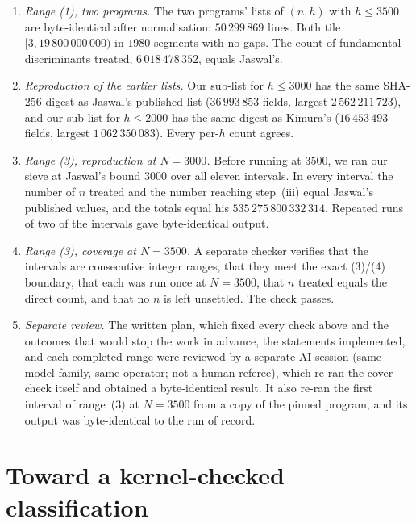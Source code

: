 \documentclass[11pt]{article}
\theoremstyle{definition}
\begin{document}
\begin{enumerate}[leftmargin=*]
\item \emph{Range (1), two programs.} The two programs' lists of $(n, h)$ with $h \le 3500$ are byte-identical after
normalisation: $50\,299\,869$ lines. Both tile $[3, 19\,800\,000\,000)$ in $1980$ segments with no gaps. The count of
fundamental discriminants treated, $6\,018\,478\,352$, equals Jaswal's.
\item \emph{Reproduction of the earlier lists.} Our sub-list for $h \le 3000$ has the same SHA-256 digest as Jaswal's
published list ($36\,993\,853$ fields, largest $2\,562\,211\,723$), and our sub-list for $h \le 2000$ has the same digest as
Kimura's ($16\,453\,493$ fields, largest $1\,062\,350\,083$). Every per-$h$ count agrees.
\item \emph{Range (3), reproduction at $N = 3000$.} Before running at $3500$, we ran our sieve at Jaswal's bound $3000$ over
all eleven intervals. In every interval the number of $n$ treated and the number reaching step~(iii) equal Jaswal's
published values, and the totals equal his $535\,275\,800\,332\,314$. Repeated runs of two of the intervals gave byte-identical output.
\item \emph{Range (3), coverage at $N = 3500$.} A separate checker verifies that the intervals are consecutive integer ranges,
that they meet the exact (3)/(4) boundary, that each was run once at $N = 3500$, that $n$ treated equals the direct count,
and that no $n$ is left unsettled. The check passes.
\item \emph{Separate review.} The written plan, which fixed every check above and the outcomes that would stop the work
in advance, the statements implemented, and each completed range were reviewed by a separate AI session (same model family, same operator; not a human
referee), which re-ran the cover check itself and obtained a byte-identical result. It also re-ran the first interval
of range~(3) at $N = 3500$ from a copy of the pinned program, and its output was byte-identical to the run of record.
\end{enumerate}

\section{Toward a kernel-checked classification}\label{sec:kernel}
\end{document}
